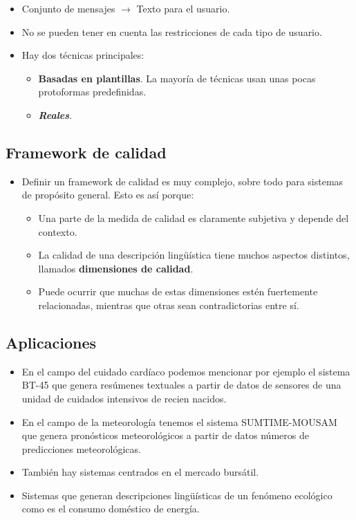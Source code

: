 \documentclass{beamer}
\begin{document}
	\begin{frame}
		\begin{itemize}
			\item Conjunto de mensajes $\longrightarrow$ Texto para el usuario.
			\item No se pueden tener en cuenta las restricciones de cada tipo de usuario.
			\item Hay dos técnicas principales:
				\begin{itemize}
					\item \textbf{Basadas en plantillas}. La mayoría de técnicas usan unas pocas protoformas predefinidas.
					\item \textbf{\textit{Reales}}.
				\end{itemize}
		\end{itemize}
	\end{frame}
	
	\subsection{Framework de calidad}
	
	\begin{frame}
		\begin{itemize}
			\item Definir un framework de calidad es muy complejo, sobre todo para sistemas de propósito general. Esto es así porque:
			\begin{itemize}
				\item Una parte de la medida de calidad es claramente subjetiva y depende del contexto.
				\item La calidad de una descripción lingüística tiene muchos aspectos distintos, llamados \textbf{dimensiones de calidad}.
				\item Puede ocurrir que muchas de estas dimensiones estén fuertemente relacionadas, mientras que otras sean contradictorias entre sí.
			\end{itemize}
		\end{itemize}		
	\end{frame}
	
	\subsection{Aplicaciones}
	
	\begin{frame}
		\begin{itemize}
			\item En el campo del cuidado cardíaco podemos mencionar por ejemplo el sistema BT-45 que genera resúmenes textuales a partir de datos de sensores de una unidad de cuidados intensivos de recien nacidos.
			\item En el campo de la meteorología tenemos el sistema SUMTIME-MOUSAM que genera pronósticos meteorológicos a partir de datos números de predicciones meteorológicas.
			\item También hay sistemas centrados en el mercado bursátil.
			\item Sistemas que generan descripciones lingüísticas de un fenómeno ecológico como es el consumo doméstico de energía.
\end{itemize}
	\end{frame}
	
\end{document}
